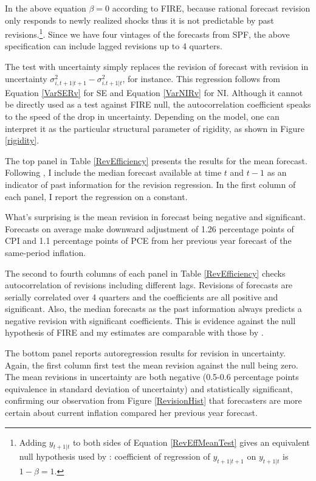 \documentclass[12pt]{article}
\begin{document}
	In the above equation $\beta =0$ according to FIRE, because rational forecast revision only responds to newly realized shocks thus it is not predictable by past revisions.\footnote{Adding $y_{t+1|t}$ to both sides of Equation \ref{RevEffMeanTest} gives an equivalent null hypothesis used by \citet{fuhrer2018intrinsic}: coefficient of regression of $y_{t+1|t+1}$ on  $y_{t+1|t}$ is $1-\beta=1$. }. Since we have four vintages of the forecasts from SPF, the above specification can include lagged revisions up to 4 quarters.  
	
	The test with uncertainty simply replaces the revision of forecast with revision in uncertainty $\sigma^2_{i,t+1|t+1} - \sigma^2_{i.t+1|t}$, for instance. This regression follows from Equation \ref{VarSERv} for SE and Equation \ref{VarNIRv} for NI. Although it  cannot be directly used as a test against FIRE null, the autocorrelation coefficient speaks to the speed of the drop in uncertainty. Depending on the model, one can interpret it as the particular structural parameter of rigidity, as shown in Figure \ref{rigidity}. 
	
	The top panel in Table \ref{RevEfficiency} presents the results for the mean forecast. Following \citet{fuhrer2018intrinsic}, I include the median forecast available at time $t$ and $t-1$ as an indicator of past information for the revision regression. In the first column of each panel, I report the regression on a constant. 
	
	What's surprising is the mean revision in forecast being negative and significant. Forecasts on average make downward adjustment of 1.26 percentage points of CPI and  1.1 percentage points of PCE from her previous year forecast of the same-period inflation. 
	
	The second to fourth columns of each panel in Table \ref{RevEfficiency} checks autocorrelation of revisions including different lags. Revisions of forecasts are serially correlated over 4 quarters and the coefficients are all positive and significant. Also, the median forecasts as the past information always predicts a negative revision with significant coefficients. This is evidence against the null hypothesis of FIRE and my estimates are comparable with those by \citet{fuhrer2018intrinsic}. 
	
	The bottom panel reports autoregression results for revision in uncertainty. Again, the first column first test the mean revision against the null being zero. The mean revisions in uncertainty are both negative (0.5-0.6 percentage points equivalence in standard deviation of uncertainty) and statistically significant, confirming our observation from Figure \ref{RevisionHist} that forecasters are more certain about current inflation compared her previous year forecast. 
	
\end{document}
